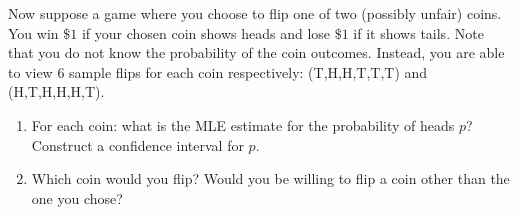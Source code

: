 Now suppose a game where you choose to flip one of two (possibly unfair) coins. You win $\$1$ if your chosen coin shows heads and lose $\$1$ if it shows tails.
Note that you do not know the probability of the coin outcomes. Instead, you are able to view 6 sample flips for each coin respectively: (T,H,H,T,T,T) and (H,T,H,H,H,T).

\begin{enumerate}[label=(\alph*)]
    \item For each coin: what is the MLE estimate for the probability of heads $p$? Construct a confidence interval for $p$.
    \item Which coin would you flip? Would you be willing to flip a coin other than the one you chose?
\end{enumerate}

\smallspace



  

